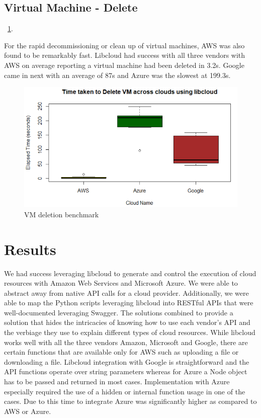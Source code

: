 \subsection{Virtual Machine - Delete}~\ref{F:vm-delete}.

For the rapid decommissioning or clean up of virtual machines, AWS was also found to be remarkably fast. Libcloud had success with all three vendors with AWS on average reporting a virtual machine had been deleted in 3.2s. Google came in next with an average of 87s and Azure was the slowest at 199.3s.

\begin{figure}[!ht]
  \centering
  \includegraphics[width=\columnwidth]{images/DeleteVM.png}
  \caption{VM deletion benchmark}\label{F:vm-delete}
\end{figure}

\section{Results}
We had success leveraging libcloud to generate and control the execution of
cloud resources with Amazon Web Services and Microsoft Azure. We were able to
abstract away from native API calls for a cloud provider. Additionally, we were
able to map the Python scripts leveraging libcloud into RESTful APIs that were
well-documented leveraging Swagger. The solutions combined to provide a
solution that hides the intricacies of knowing how to use each vendor's API and
the verbiage they use to explain different types of cloud resources. While
libcloud works well with all the three vendors Amazon, Microsoft and Google,
there are certain functions that are available only for AWS such as uploading
a file or downloading a file. Libcloud integration with Google is straightforward
and the API functions operate over string parameters whereas for Azure a Node
object has to be passed and returned in most cases. Implementation with Azure
especially required the use of a hidden or internal function usage in one of the
cases. Due to this time to integrate Azure was significantly higher as compared
to AWS or Azure.

